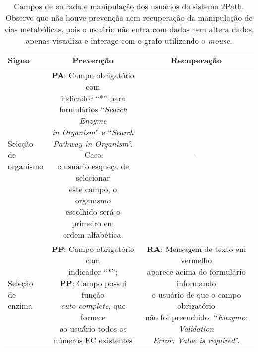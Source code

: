 \indent 
\begin{table}
\centering
\caption{Campos de entrada e manipulação dos usuários do sistema 2Path. Observe que não houve prevenção nem recuperação da manipulação de vias metabólicas, pois o usuário não entra com dados nem altera dados, apenas visualiza e interage com o grafo utilizando o \textit{mouse}.} \label{prevencaoRecuperacao:2Path}
\begin{tabular}{|l|c|c|}
\hline
{\cellcolor[HTML]{DFDFDF}\textbf{Signo}} &  {\cellcolor[HTML]{DFDFDF}\textbf{Prevenção}} &  {\cellcolor[HTML]{DFDFDF}\textbf{Recuperação}}\\ \hline
\specialcell{Seleção de\\organismo}  & \specialcell{\textbf{PA}: Campo obrigatório com\\indicador ``*'' para\\ formulários ``\textit{Search Enzyme}\\\textit{in Organism}'' e  ``\textit{Search}\\\textit{Pathway in Organism}''. Caso\\o usuário esqueça de selecionar\\este campo, o organismo\\escolhido será o primeiro em\\ordem alfabética.} & -  \\ \hline

\specialcell{Seleção de\\enzima} & \specialcell{\textbf{PP}: Campo obrigatório com\\indicador ``*'';\\\textbf{PP}: Campo possui função\\\textit{auto-complete}, que fornece\\ao usuário todos os\\números EC existentes} & \specialcell{\textbf{RA}: Mensagem de texto em vermelho \\aparece acima do formulário informando\\o usuário de que o campo obrigatório\\não foi preenchido: ``\textit{Enzyme: Validation}\\\textit{ Error: Value is required}''.} \\ \hline


\end{tabular}
\end{table}
